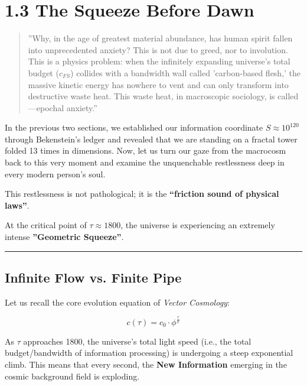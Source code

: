 \section*{1.3 The Squeeze Before Dawn}

\begin{quote}
''Why, in the age of greatest material abundance, has human spirit fallen into unprecedented anxiety? This is not due to greed, nor to involution. This is a physics problem: when the infinitely expanding universe's total budget ($c_{FS}$) collides with a bandwidth wall called 'carbon-based flesh,' the massive kinetic energy has nowhere to vent and can only transform into destructive waste heat. This waste heat, in macroscopic sociology, is called---epochal anxiety.''
\end{quote}

In the previous two sections, we established our information coordinate $S \approx 10^{120}$ through Bekenstein's ledger and revealed that we are standing on a fractal tower folded 13 times in dimensions. Now, let us turn our gaze from the macrocosm back to this very moment and examine the unquenchable restlessness deep in every modern person's soul.

This restlessness is not pathological; it is the \textbf{``friction sound of physical laws''}.

At the critical point of $\tau \approx 1800$, the universe is experiencing an extremely intense \textbf{''Geometric Squeeze''}.

\hrule

\subsection{Infinite Flow vs. Finite Pipe}

Let us recall the core evolution equation of \textit{Vector Cosmology}:

$$c(\tau) = c_0 \cdot \phi^{\frac{\tau}{\pi}}$$

As $\tau$ approaches 1800, the universe's total light speed (i.e., the total budget/bandwidth of information processing) is undergoing a steep exponential climb. This means that every second, the \textbf{New Information} emerging in the cosmic background field is exploding.

